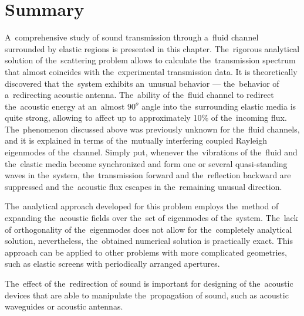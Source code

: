 \section{Summary}
A~comprehensive study of sound transmission through a~fluid channel surrounded by elastic regions is presented in this chapter.
The~rigorous analytical solution of the~scattering problem allows to calculate the~transmission spectrum that almost coincides with the~experimental transmission data.
It is theoretically discovered that the~system exhibits an~unusual behavior --- the~behavior of a~redirecting acoustic antenna.
The~ability of the~fluid channel to redirect the~acoustic energy at an~almost $90^o$ angle into the~surrounding elastic media is quite strong, allowing to affect up to approximately 10\% of the~incoming flux.
The~phenomenon discussed above was previously unknown for the~fluid channels, and it is explained in terms of the~mutually interfering coupled Rayleigh eigenmodes of the~channel.
Simply put, whenever the~vibrations of the~fluid and the~elastic media become synchronized and form one or several quasi-standing waves in the~system, the~transmission forward and the~reflection backward are suppressed and the~acoustic flux escapes in the~remaining unusual direction.

The~analytical approach developed for this problem employs the~method of expanding the~acoustic fields over the~set of eigenmodes of the~system.
The~lack of orthogonality of the~eigenmodes does not allow for the~completely analytical solution, nevertheless, the~obtained numerical solution is  practically exact.
This approach can be applied to other problems with more complicated geometries, such as elastic screens with periodically arranged apertures.

The~effect of the~redirection of sound is important for designing of the~acoustic devices that are able to manipulate the~propagation of sound, such as acoustic waveguides or acoustic antennas.

